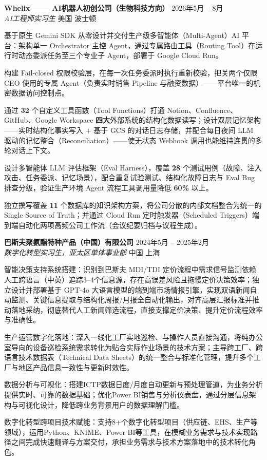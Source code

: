 \documentclass[11pt]{article}
\newcommand{\jobheader}[4]{%
  \vspace{1pt}%
  {\textbf{#1} \hfill #3} \\[-2pt]
  {\textit{#2} \hfill #4} \\[-4pt]
}
\begin{document}
\jobheader{Whelix —— AI机器人初创公司（生物科技方向）}{AI工程师实习生}{2026年5月 -- 8月}{美国 \quad 波士顿}
\begin{rbullet}
  \item 基于原生 Gemini SDK 从零设计并交付生产级多智能体（Multi-Agent）AI 平台：架构单一 Orchestrator 主控 Agent，通过专属路由工具（Routing Tool）在运行时动态委派任务至三个专业子 Agent，部署于 Google Cloud Run。
  \item 构建 Fail-closed 权限校验层，在每一次任务委派时执行重新校验，把关两个仅限 CEO 使用的专属 Agent（负责实时销售 Pipeline 与融资数据）——平台唯一的机密数据访问控制点。
  \item 通过 \textbf{32} 个自定义工具函数（Tool Functions）打通 Notion、Confluence、GitHub、Google Workspace \textbf{四大}外部系统的结构化数据读写；设计双层记忆架构——实时结构化事实写入 + 基于 GCS 的对话日志存储，并配合每日夜间 LLM 驱动的记忆整合（Reconciliation）——使无状态 Webhook 调用也能维持连贯的多轮对话上下文。
  \item 设计多智能体 LLM 评估框架（Eval Harness），覆盖 \textbf{28} 个测试用例（故障、注入攻击、任务委派、记忆场景），配合重复试验测试、结构化故障日志与 Eval Bug 排查分级，验证生产环境 Agent 流程工具调用量降低 \textbf{60\%} 以上。
  \item 独立撰写覆盖 \textbf{11} 个数据库的知识架构方案，将公司分散的内部文档整合为统一的 Single Source of Truth；并通过 Cloud Run 定时触发器（Scheduled Triggers）端到端自动化两项高频公司工作流（会议纪要归档与议程生成）。
\end{rbullet}

\vspace{1pt}

\jobheader{巴斯夫聚氨酯特种产品（中国）有限公司}{数字化转型实习生，亚太区单体事业部}{2024年5月 -- 2025年2月}{中国 \quad 上海}
\begin{rbullet}
  \item 智能决策支持系统搭建：识别到巴斯夫 MDI/TDI 定价流程中需求信号监测依赖人工跨语言（中英）追踪3–4个信息源，存在高误差风险且拖慢定价决策效率；独立设计并部署基于 GPT-4o 大语言模型的端到端市场情报引擎，实现双语新闻自动监测、关键信息提取与结构化周报/月报全自动化输出，对齐高层汇报标准并推动落地采纳，彻底替代人工新闻筛选流程，直接支撑定价决策、提升定价流程效率与准确性。
  \item 生产运营数字化落地：深入一线化工厂实地巡检、与操作人员直接沟通，将纯办公室导向的设备巡检系统需求转化为贴合实际作业场景的技术方案；主导跨工厂、跨语言技术数据表（Technical Data Sheets）的统一整合与标准化管理，提升多个工厂与地区产品信息一致性与更新时效性。
  \item 数据分析与可视化：搭建ICTP数据日度/月度自动更新与预处理管道，为业务分析提供实时、可靠的数据基础；优化Power BI销售与分析仪表盘，通过分层信息架构与可视化设计，降低跨业务背景用户的数据理解门槛。
  \item 数字化转型跨项目技术赋能：支持8+个数字化转型项目（供应链、EHS、生产等领域），运用Python、KNIME、Power BI等工具，在模糊业务需求与技术实现路径之间完成快速翻译与方案交付，承担业务需求与技术方案落地中的技术转化角色。
 \end{rbullet}
\end{document}
